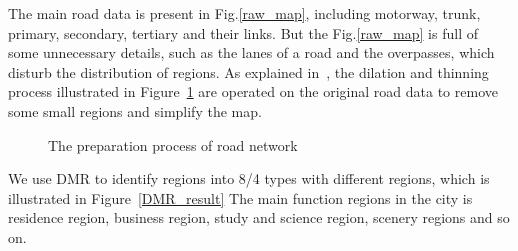 \documentclass[runningheads]{llncs}
\begin{document}
The main road data is present in Fig.\ref{raw_map}, including motorway, trunk, primary, secondary, tertiary and their links.
But the Fig.\ref{raw_map} is full of some unnecessary details, such as the lanes of a road and the overpasses, which disturb the distribution of regions.
As explained in~\cite{Yuan2015FunctionRegion}, the dilation and thinning process illustrated in Figure~\ref{dilation and thinning} are operated on the original road data to remove some small regions and simplify the map.
\begin{figure}[h]
    \centering
    \caption{The preparation process of road network}
    \label{dilation and thinning} %
\end{figure}

We use DMR to identify regions into 8/4 types with different regions, which is illustrated in Figure~\ref{DMR_result}
The main function regions in the city is residence region, business region, study and science region, scenery regions and so on.
\end{document}
